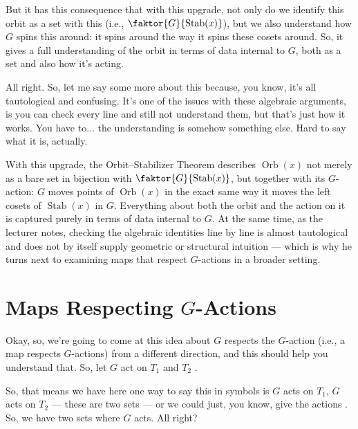 \begin{speech}[00:19:25 - 00:20:48]
But it has this consequence that with this upgrade, not only do we identify this orbit as a set with this (i.e., $\faktor{G}{\operatorname{Stab}(x)}$), but we also understand how $G$ spins this around: it spins around the way it spins these cosets around. So, it gives a full understanding of the orbit in terms of data internal to $G$, both as a set and also how it's acting.

All right. So, let me say some more about this because, you know, it's all tautological and confusing. It's one of the issues with these algebraic arguments, is you can check every line and still not understand them, but that's just how it works. You have to... the understanding is somehow something else. Hard to say what it is, actually.
\end{speech}

\begin{insight}
With this upgrade, the Orbit--Stabilizer Theorem describes $\operatorname{Orb}(x)$ not merely as a bare set in bijection with $\faktor{G}{\operatorname{Stab}(x)}$, but together with its $G$-action: $G$ moves points of $\operatorname{Orb}(x)$ in the exact same way it moves the left cosets of $\operatorname{Stab}(x)$ in $G$. Everything about both the orbit and the action on it is captured purely in terms of data internal to $G$. At the same time, as the lecturer notes, checking the algebraic identities line by line is almost tautological and does not by itself supply geometric or structural intuition --- which is why he turns next to examining maps that respect $G$-actions in a broader setting.
\end{insight}

\section{Maps Respecting \texorpdfstring{$G$}{G}-Actions}

\begin{speech}[00:20:48 - 00:21:05]
Okay, so, we're going to come at this idea about $G$ respects the $G$-action (i.e., a map respects $G$-actions) from a different direction, and this should help you understand that. So, let $G$ act on $T_1$ and $T_2$ .
\end{speech}

\begin{speech}[00:21:06 - 00:21:24]
So, that means we have here one way to say this in symbols is $G$ acts on $T_1$, $G$ acts on $T_2$  --- these are two sets --- or we could just, you know, give the actions . So, we have two sets where $G$ acts. All right?
\end{speech}

